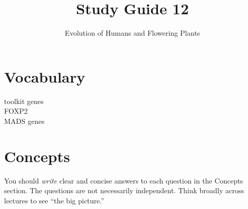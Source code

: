 \documentclass[letterpaper]{tufte-handout}
\title{Study Guide 12\hfill}
\author{Evolution of Humans and Flowering Plants}
\date{} %
\begin{document}
\maketitle	%


\section{Vocabulary} 
\vspace{-1\baselineskip}
\begin{multicols}{2}
toolkit genes\\
FOXP2\\
MADS genes\\
\end{multicols}

\section{Concepts}

You should \emph{write} clear and concise answers to each question in the Concepts section.  The questions are not necessarily independent.  Think broadly across lectures to see ``the big picture.'' 
\end{document}
